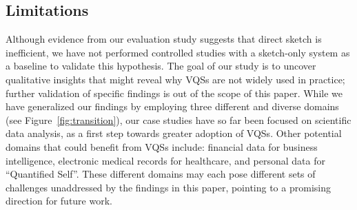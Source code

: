 \subsection{Limitations}
\par Although evidence from our evaluation study
suggests that direct sketch is inefficient,
we have not performed controlled studies
with a sketch-only system as a baseline to validate this hypothesis.
The goal of our study is to uncover qualitative insights
that might reveal why VQSs are not widely used in practice;
further validation of specific findings is out of the scope of this paper.
While we have generalized our findings by employing
three different and diverse domains (see Figure~\ref{fig:transition}),
our case studies have so far
been focused on scientific data analysis,
as a first step towards greater adoption of VQSs.
Other potential domains that could benefit from VQSs include:
financial data for business intelligence,
electronic medical records for healthcare,
and personal data for ``Quantified Self''.
These different domains may each pose different
 sets of challenges unaddressed
 by the findings in this paper,
 pointing to a promising direction for future work.
